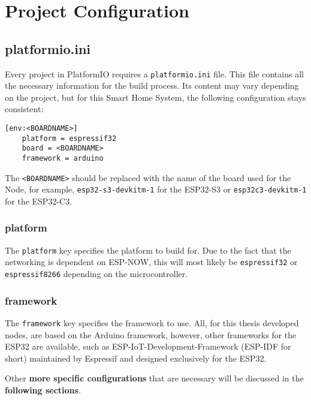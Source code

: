 \section{Project Configuration}

    \subsection{platformio.ini}
    Every project in PlatformIO requires a \texttt{platformio.ini} file. This file
    contains all the necessary information for the build process. Its content may
    vary depending on the project, but for this Smart Home System, the following
    configuration stays consistent:
    \begin{lstlisting}[style=cppCode]
    [env:<BOARDNAME>]
    platform = espressif32
    board = <BOARDNAME>
    framework = arduino
    \end{lstlisting}
    The \texttt{<BOARDNAME>} should be replaced with the name of the board used
    for the Node, for example, \texttt{esp32-s3-devkitm-1} for the ESP32-S3 or
    \texttt{esp32c3-devkitm-1} for the ESP32-C3.

        \subsubsection{platform}
        The \texttt{platform} key specifies the platform to build for. Due to the
        fact that the networking is dependent on ESP-NOW, this will most likely be
        \texttt{espressif32} or \texttt{espressif8266} depending on the 
        microcontroller.
        
        \subsubsection{framework}
        The \texttt{framework} key specifies the framework to use. All, for this 
        thesis developed nodes, are based on the Arduino framework, however, other
        frameworks for the ESP32 are available, such as ESP-IoT-Development-Framework
        (ESP-IDF for short) maintained by Espressif and designed exclusively for the 
        ESP32.
        
        Other \textbf{more specific 
        configurations} that are necessary will be discussed in the \textbf{following 
        sections}.

